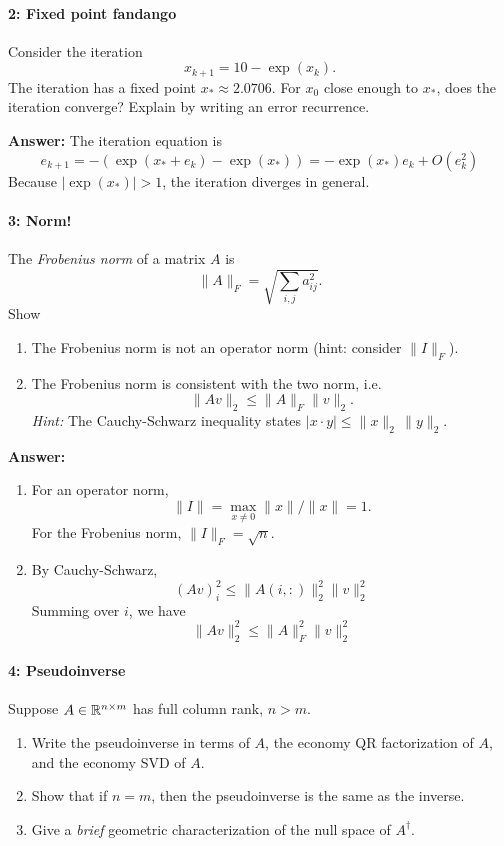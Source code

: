 \documentclass[12pt, leqno]{article}
\begin{document}
\paragraph*{2: Fixed point fandango}
Consider the iteration
\[
  x_{k+1} = 10-\exp(x_k).
\]
The iteration has a fixed point $x_* \approx 2.0706$.  For $x_0$
close enough to $x_*$, does the iteration converge?  Explain
by writing an error recurrence.

{\bf Answer:}
The iteration equation is
\[
  e_{k+1} = -(\exp(x_*+e_k)-\exp(x_*)) = -\exp(x_*) e_k + O(e_k^2)
\]
Because $|\exp(x_*)| > 1$, the iteration diverges in general.

\paragraph*{3: Norm!}
The {\em Frobenius norm} of a matrix $A$ is
\[
  \|A\|_F = \sqrt{ \sum_{i,j} a_{ij}^2 }.
\]
Show
\begin{enumerate}
\item
  The Frobenius norm is not an operator norm (hint: consider
  $\|I\|_F$).
\item
  The Frobenius norm is consistent with the two norm, i.e.
  \[
    \|Av\|_2 \leq \|A\|_F \|v\|_2.
  \]
  {\em Hint:} The Cauchy-Schwarz inequality states $|x \cdot y| \leq
  \|x\|_2 \, \|y\|_2$.
\end{enumerate}

{\bf Answer:}
\begin{enumerate}
\item
  For an operator norm,
  \[
    \|I\| = \max_{x \neq 0} \|x\|/\|x\| = 1.
  \]
  For the Frobenius norm, $\|I\|_F = \sqrt{n}$.
\item
  By Cauchy-Schwarz,
  \[
    (Av)_i^2 \leq \|A(i,:)\|_2^2 \|v\|_2^2
  \]
  Summing over $i$, we have
  \[
    \|Av\|_2^2 \leq \|A\|_F^2 \|v\|_2^2
  \]
\end{enumerate}

\paragraph*{4: Pseudoinverse}
Suppose $A \in \mathbb{R}^{n \times m}$ has full column rank, $n > m$.
\begin{enumerate}
\item
  Write the pseudoinverse in terms of $A$, the economy QR
  factorization of $A$, and the economy SVD of $A$.
\item
  Show that if $n = m$, then the pseudoinverse is the same as the
  inverse.
\item
  Give a {\em brief} geometric characterization of the null space of
  $A^\dagger$.
\end{enumerate}
\end{document}
